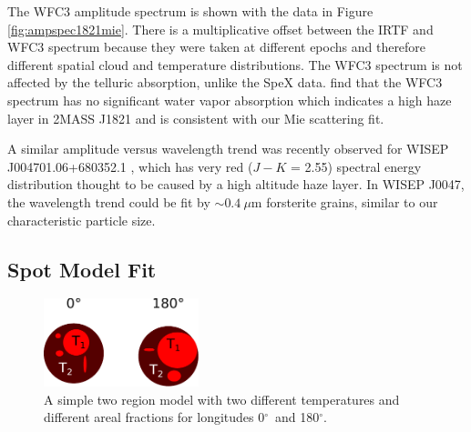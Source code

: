 \documentclass[twocolumn]{aastex6}
\newcommand{\degree}{$^\circ$}
\begin{document}
The WFC3 amplitude spectrum is shown with the data in Figure \ref{fig:ampspec1821mie}.
There is a multiplicative offset between the IRTF and WFC3 spectrum because they were taken at different epochs and therefore different spatial cloud and temperature distributions.
The WFC3 spectrum is not affected by the telluric absorption, unlike the SpeX data.
\citet{2015ApJ...798L..13Y} find that the WFC3 spectrum has no significant water vapor absorption which indicates a high haze layer in 2MASS J1821 and is consistent with our Mie scattering fit.

A similar amplitude versus wavelength trend was recently observed for WISEP J004701.06+680352.1 \citep{2016ApJ...829L..32L}, which has very red ($J-K$ = 2.55) spectral energy distribution thought to be caused by a high altitude haze layer.
In WISEP J0047, the wavelength trend could be fit by $\sim0.4~\mu$m forsterite grains, similar to our characteristic particle size.

\subsection{Spot Model Fit}\label{sec:spotModel}

\begin{figure}
\begin{centering}
\includegraphics[width=0.4\textwidth]{temperature_drawing.pdf}
\caption{A simple two region model with two different temperatures and different areal fractions for longitudes 0\degree\ and 180\degree.}\label{fig:tdiffschem}
\end{centering}
\end{figure}
\end{document}
